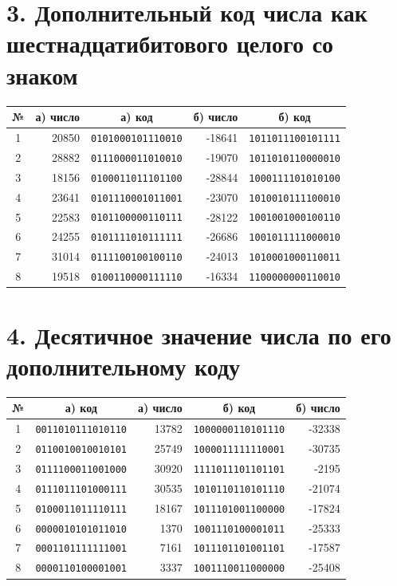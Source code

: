 \documentclass[a4paper,12pt]{article}
\newcommand{\bin}[1]{\texttt{#1}}
\begin{document}
\section*{3. Дополнительный код числа как шестнадцатибитового целого со знаком}

\begin{center}
\begin{tabular}{c|r|c|r|c}
\toprule
№ & а) число & а) код & б) число & б) код \\
\midrule
1 & 20850 & \bin{0101000101110010} & -18641 & \bin{1011011100101111} \\
2 & 28882 & \bin{0111000011010010} & -19070 & \bin{1011010110000010} \\
3 & 18156 & \bin{0100011011101100} & -28844 & \bin{1000111101010100} \\
4 & 23641 & \bin{0101110001011001} & -23070 & \bin{1010010111100010} \\
5 & 22583 & \bin{0101100000110111} & -28122 & \bin{1001001000100110} \\
6 & 24255 & \bin{0101111010111111} & -26686 & \bin{1001011111000010} \\
7 & 31014 & \bin{0111100100100110} & -24013 & \bin{1010001000110011} \\
8 & 19518 & \bin{0100110000111110} & -16334 & \bin{1100000000110010} \\
\bottomrule
\end{tabular}
\end{center}

\section*{4. Десятичное значение числа по его дополнительному коду}

\begin{center}
\begin{tabular}{c|c|r|c|r}
\toprule
№ & а) код & а) число & б) код & б) число \\
\midrule
1 & \bin{0011010111010110} & 13782 & \bin{1000000110101110} & -32338 \\
2 & \bin{0110010010010101} & 25749 & \bin{1000011111110001} & -30735 \\
3 & \bin{0111100011001000} & 30920 & \bin{1111011101101101} & -2195 \\
4 & \bin{0111011101000111} & 30535 & \bin{1010110110101110} & -21074 \\
5 & \bin{0100011011110111} & 18167 & \bin{1011101001100000} & -17824 \\
6 & \bin{0000010101011010} & 1370  & \bin{1001110100001011} & -25333 \\
7 & \bin{0001101111111001} & 7161  & \bin{1011101101001101} & -17587 \\
8 & \bin{0000110100001001} & 3337  & \bin{1001110011000000} & -25408 \\
\bottomrule
\end{tabular}
\end{center}
\end{document}
